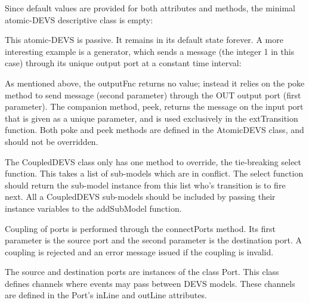 Since default values are provided for both attributes and methods, the minimal atomic-DEVS descriptive class is empty:


This atomic-DEVS is passive. It remains in its default state forever. A more interesting example is a generator, which sends a message 
(the integer 1 in this case) through its unique output port at a constant time interval:


As mentioned above, the outputFnc returns no value; instead it relies on the poke method to send message (second parameter) through the 
OUT output port (first parameter). The companion method, peek, returns the message on the input port that is given as a unique parameter, 
and is used exclusively in the extTransition function. Both poke and peek methods are defined in the AtomicDEVS class, and should not be 
overridden.

The CoupledDEVS class only has one method to override, the tie-breaking select function. This takes a list of sub-models which are in 
conflict. The select function should return the sub-model instance from this list who's transition is to fire next. All a CoupledDEVS 
sub-models should be included by passing their instance variables to the addSubModel function.

Coupling of ports is performed through the connectPorts method. Its first parameter is the source port and the second parameter is the 
destination port. A coupling is rejected and an error message issued if the coupling is invalid.

The source and destination ports are instances of the class Port. This class defines channels where events may pass between DEVS models. 
These channels are defined in the Port's inLine and outLine attributes.

